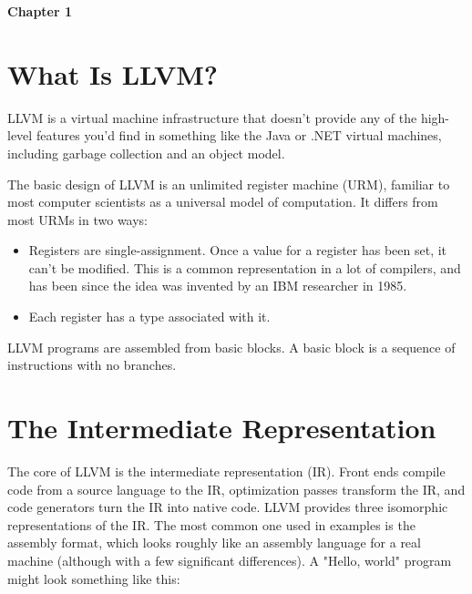 \documentclass[a4paper,10pt]{article}
\begin{document}
\begin{center}
{\bf {\LARGE Chapter 1}\linebreak{}}
\linebreak
\linebreak
\end{center}

\section{What Is LLVM?}
LLVM is a virtual machine infrastructure that doesn’t provide any of the high-level features you’d find in something like the Java or .NET virtual machines, including garbage collection and an object model.

The basic design of LLVM is an unlimited register machine (URM), familiar to most computer scientists as a universal model of computation. It differs from most URMs in two ways:

\begin{itemize}
\item Registers are single-assignment. Once a value for a register has been set, it can’t be modified. This is a common representation in a lot of compilers, and has been since the idea was invented by an IBM researcher in 1985.
\item Each register has a type associated with it.
\end{itemize}

LLVM programs are assembled from basic blocks. A basic block is a sequence of instructions with no branches.

\section{The Intermediate Representation}

The core of LLVM is the intermediate representation (IR). Front ends compile code from a source language to the IR, optimization passes transform the IR, and code generators turn the IR into native code.
LLVM provides three isomorphic representations of the IR. The most common one used in examples is the assembly format, which looks roughly like an assembly language for a real machine (although with a few significant differences). A "Hello, world" program might look something like this:
\end{document}
